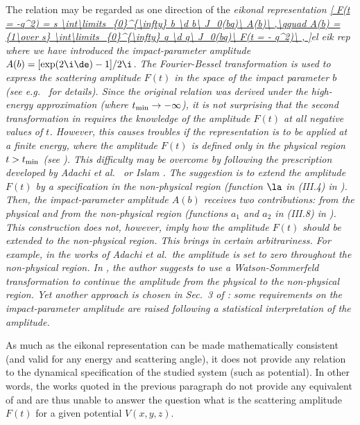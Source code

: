 The relation  may be regarded as one direction of the \em{eikonal representation}
\eqref{
	F(t = -q^2) = s \int\limits_{0}^{\infty} b \d b\ J_0(bq)\ A(b)\ ,\qquad
	A(b) = {1\over s} \int\limits_{0}^{\infty} q \d q\ J_0(bq)\ F(t = - q^2)\ ,
}{el eik rep}
where we have introduced the \em{impact-parameter amplitude} $A(b) = [\exp(2\i\de) - 1] / 2\i$.  The Fourier-Bessel transformation is used to express the scattering amplitude $F(t)$ in the space of the impact parameter $b$ (see e.g.~ for details). Since the original relation  was derived under the high-energy approximation (where $t_{\rm min} \to -\infty$), it is not surprising that the second transformation in  requires the knowledge of the amplitude $F(t)$ at all negative values of $t$. However, this causes troubles if the representation is to be applied at a finite energy, where the amplitude $F(t)$ is defined only in the physical region $t > t_{\rm min}$ (see ). This difficulty may be overcome by following the prescription developed by Adachi et al.\  or Islam . The suggestion is to extend the amplitude $F(t)$ by a specification in the non-physical region (function $\la$ in (III.4) in ). Then, the impact-parameter amplitude $A(b)$ receives two contributions: from the physical and from the non-physical region (functions $a_1$ and $a_2$ in (III.8) in ). This construction does not, however, imply how the amplitude $F(t)$ should be extended to the non-physical region. This brings in certain arbitrariness. For example, in the works of Adachi et al.~the amplitude is set to zero throughout the non-physical region. In , the author suggests to use a Watson-Sommerfeld transformation to continue the amplitude from the physical to the non-physical region. Yet another approach is chosen in Sec.~3 of : some requirements on the impact-parameter amplitude are raised following a statistical interpretation of the amplitude.

As much as the eikonal representation  can be made mathematically consistent (and valid for any energy and scattering angle), it does not provide any relation to the dynamical specification of the studied system (such as potential). In other words, the works quoted in the previous paragraph do not provide any equivalent of  and are thus unable to answer the question what is the scattering amplitude $F(t)$ for a given potential $V(x, y, z)$.

